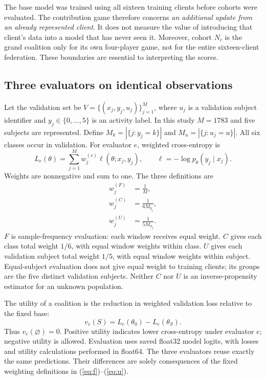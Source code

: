 \documentclass[conference,letterpaper]{IEEEtran}
\begin{document}
The base model was trained using all sixteen training clients before cohorts were evaluated. The contribution game therefore concerns \emph{an additional update from an already represented client}. It does not measure the value of introducing that client's data into a model that has never seen it. Moreover, cohort $N_c$ is the grand coalition only for its own four-player game, not for the entire sixteen-client federation. These boundaries are essential to interpreting the scores.

\subsection{Three evaluators on identical observations}
Let the validation set be $V=\{(x_j,y_j,u_j)\}_{j=1}^{M}$, where $u_j$ is a validation subject identifier and $y_j\in\{0,\ldots,5\}$ is an activity label. In this study $M=1783$ and five subjects are represented. Define $M_k=|\{j:y_j=k\}|$ and $M_u=|\{j:u_j=u\}|$. All six classes occur in validation. For evaluator $e$, weighted cross-entropy is
\begin{equation}
L_e(\theta)=\sum_{j=1}^{M}w_j^{(e)}\ell(\theta;x_j,y_j),\qquad
\ell=-\log p_\theta(y_j\mid x_j).
\label{eq:loss}
\end{equation}
Weights are nonnegative and sum to one. The three definitions are
\begin{align}
w_j^{(F)}&=\frac{1}{M},\label{eq:f}\\
w_j^{(C)}&=\frac{1}{6M_{y_j}},\label{eq:c}\\
w_j^{(U)}&=\frac{1}{5M_{u_j}}.\label{eq:u}
\end{align}
$F$ is sample-frequency evaluation: each window receives equal weight. $C$ gives each class total weight $1/6$, with equal window weights within class. $U$ gives each validation subject total weight $1/5$, with equal window weights within subject. Equal-subject evaluation does not give equal weight to training clients; its groups are the five distinct validation subjects. Neither $C$ nor $U$ is an inverse-propensity estimator for an unknown population.

The utility of a coalition is the reduction in weighted validation loss relative to the fixed base:
\begin{equation}
v_e(S)=L_e(\theta_0)-L_e(\theta_S).
\label{eq:utility}
\end{equation}
Thus $v_e(\varnothing)=0$. Positive utility indicates lower cross-entropy under evaluator $e$; negative utility is allowed. Evaluation uses saved float32 model logits, with losses and utility calculations performed in float64. The three evaluators reuse exactly the same predictions. Their differences are solely consequences of the fixed weighting definitions in (\ref{eq:f})--(\ref{eq:u}).
\end{document}
